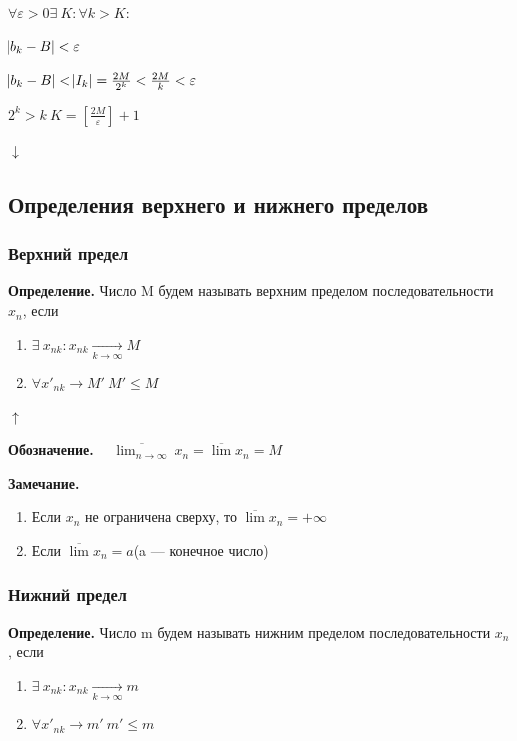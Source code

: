 \documentclass{article}
\begin{document}
    \( \forall \varepsilon > 0 \exists\ K: \forall k > K:\) 

    \(\abs{b_k - B} < \varepsilon\)

    \( \abs{b_k - B} < \abs{I_k} = \frac{2M}{2^k} < \frac{2M}{k} < \varepsilon \)

    \( 2^k > k\ K = [\frac{2M}{\varepsilon}] + 1\)

    \(\downarrow\)
    
    \subsection{Определения верхнего и нижнего пределов}
    
    \subsubsection{Верхний предел}
    
    \textbf{Определение.} Число M будем называть верхним пределом последовательности \(x_n\), если
    \begin{enumerate}
        \item \( \exists\ x_{nk}: x_{nk}  \xrightarrow[k \rightarrow \infty]{} M\)
    
        \item \(\forall x'_{nk} \rightarrow M'\ M' \leq M\)

    \end{enumerate}
    \( \uparrow \)

    \textbf{Обозначение.} \(\quad \overline{\lim_{n \rightarrow \infty}}\ x_n = \overline{\lim} x_n = M \)
    
    \textbf{Замечание.} 
    \begin{enumerate}
        \item Если \(x_n\) не ограничена сверху, то \(\overline{\lim}x_n = +\infty\)
        
        \item Если \(\overline{\lim}x_n = a\)(a --- конечное число)
    \end{enumerate}
    
    \subsubsection{Нижний предел}
    
    \textbf{Определение.} Число m будем называть нижним пределом последовательности \(x_n\), если
    \begin{enumerate}
        \item \( \exists\ x_{nk}: x_{nk}  \xrightarrow[k \rightarrow \infty]{} m\)
    
        \item \(\forall x'_{nk} \rightarrow m'\ m' \leq m\)

    \end{enumerate}
\end{document}
